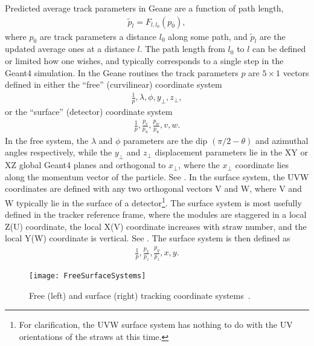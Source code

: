 Predicted average track parameters in Geane are a function of path length, 
        \begin{align} \label{eq:pp}
            \widetilde{p}_{l} = F_{l,l_{0}}(p_{0}),
        \end{align}
where $p_{0}$ are track parameters a distance $l_{0}$ along some path, and $\widetilde{p}_{l}$ are the updated average ones at a distance $l$. The path length from $l_{0}$ to $l$ can be defined or limited how one wishes, and typically corresponds to a single step in the Geant4 simulation. In the Geane routines the track parameters $p$ are $5 \times 1$ vectors defined in either the ``free'' (curvilinear) coordinate system
        \begin{align}
            \frac{1}{p}, \lambda, \phi, y_{\perp}, z_{\perp},
        \end{align}
or the ``surface'' (detector) coordinate system 
        \begin{align} \label{eq:UVW}
            \frac{1}{p}, \frac{p_{v}}{p_{u}}, \frac{p_{w}}{p_{u}}, v, w.
        \end{align}
In the free system, the $\lambda$ and $\phi$ parameters are the dip $(\pi/2 - \theta)$ and azimuthal angles respectively, while the $y_{\perp}$ and $z_{\perp}$ displacement parameters lie in the XY or XZ global Geant4 planes and orthogonal to $x_{\perp}$, where the $x_{\perp}$ coordinate lies along the momentum vector of the particle. See . In the surface system, the UVW coordinates are defined with any two orthogonal vectors V and W, where V and W typically lie in the surface of a detector\footnote{For clarification, the UVW surface system has nothing to do with the UV orientations of the straws at this time.}. The surface system is most usefully defined in the tracker reference frame, where the modules are staggered in a local Z(U) coordinate, the local X(V) coordinate increases with straw number, and the local Y(W) coordinate is vertical. See . The surface system is then defined as
        \begin{align}
            \frac{1}{p}, \frac{p_{x}}{p_{z}}, \frac{p_{y}}{p_{z}}, x, y.
        \end{align}


\begin{figure}
  \centering
  \texttt{[image: FreeSurfaceSystems]}
    \caption[Free and surface tracking coordinate systems]{Free (left) and surface (right) tracking coordinate systems~\cite{Lavezzi}.}
    \label{fig:FreeSurfaceSystems}
\end{figure}

